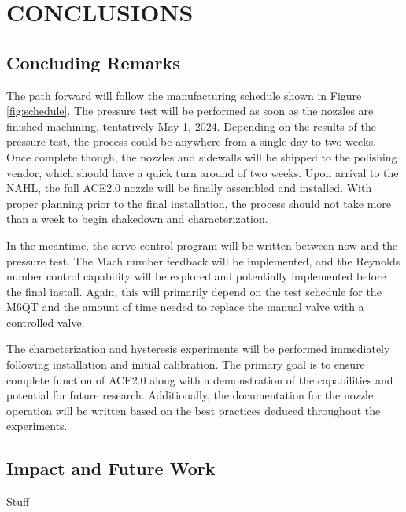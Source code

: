 %
%  
%

\chapter{CONCLUSIONS}

\section{Concluding Remarks}

The path forward will follow the manufacturing schedule shown in Figure \ref{fig:schedule}. The pressure test will be performed as soon as the nozzles are finished machining, tentatively May 1, 2024. Depending on the results of the pressure test, the process could be anywhere from a single day to two weeks. Once complete though, the nozzles and sidewalls will be shipped to the polishing vendor, which should have a quick turn around of two weeks. Upon arrival to the NAHL, the full ACE2.0 nozzle will be finally assembled and installed. With proper planning prior to the final installation, the process should not take more than a week to begin shakedown and characterization.

In the meantime, the servo control program will be written between now and the pressure test. The Mach number feedback will be implemented, and the Reynolds number control capability will be explored and potentially implemented before the final install. Again, this will primarily depend on the test schedule for the M6QT and the amount of time needed to replace the manual valve with a controlled valve. 

The characterization and hysteresis experiments will be performed immediately following installation and initial calibration. The primary goal is to ensure complete function of ACE2.0 along with a demonstration of the capabilities and potential for future research. Additionally, the documentation for the nozzle operation will be written based on the best practices deduced throughout the experiments.

\section{Impact and Future Work}

Stuff


\nocite{aiaa-uncertainty-standard}
\nocite{anderson-fundamentals}
\nocite{anderson-compressible}
